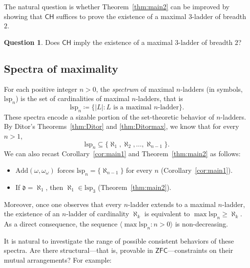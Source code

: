 \documentclass[]{amsart}
\theoremstyle{definition}
\newtheorem{question}{Question}
\theoremstyle{remark}
\begin{document}
The natural question is whether Theorem~\ref{thm:main2} can be improved by showing that  $\mathsf{CH}$ suffices to prove the existence of a maximal $3$-ladder of breadth $2$.

\begin{question}
Does $\mathsf{CH}$ imply the existence of a maximal $3$-ladder of breadth $2$?
\end{question}

\subsection{Spectra of maximality}
For each positive integer $n > 0$,  the \emph{spectrum} of maximal $n$-ladders  (in symbols, $\mathrm{lsp}_n$) is the set of cardinalities of maximal $n$-ladders, that is
\[
\mathrm{lsp}_n \coloneqq \big\{|L| : L \text{ is a maximal }n\text{-ladder}\big\}.
\]
These spectra encode a sizable portion of the set-theoretic behavior of $n$-ladders. By Ditor's Theorems~\ref{thm:Ditor} and \ref{thm:Ditormax}, we know that for every $n > 1$,
\[
\mathrm{lsp}_n \subseteq \{\aleph_1, \aleph_2, \dots, \aleph_{n-1}\}.
\]
We can also recast Corollary~\ref{cor:main1} and Theorem~\ref{thm:main2} as follows:
\begin{itemize}
\item $\text{Add}(\omega, \omega_\omega)$ forces $\mathrm{lsp}_n = \{\aleph_{n-1}\}$ for every $n$ (Corollary~\ref{cor:main1}).
\item If $\mathfrak{d} = \aleph_1$, then $\aleph_1 \in \mathrm{lsp}_3$ (Theorem~\ref{thm:main2}).
\end{itemize}

Moreover, once one observes that every $n$-ladder extends to a maximal $n$-ladder, the existence of an $n$-ladder of cardinality $\aleph_k$ is equivalent to $\max \mathrm{lsp}_n \ge \aleph_k$. As a direct consequence, the sequence $\langle \max \mathrm{lsp}_n : n >  0\rangle$ is non-decreasing. 

It is natural to investigate the range of possible consistent behaviors of these spectra.
Are there structural---that is, provable in $\mathsf{ZFC}$---constraints on their mutual arrangements? For example:
\end{document}

